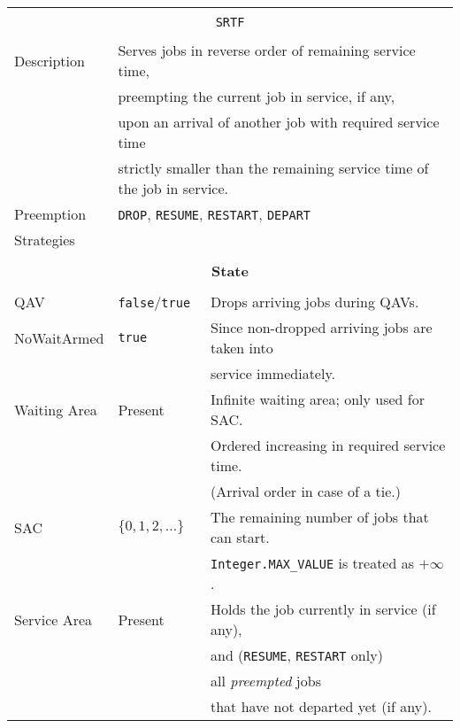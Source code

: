 \documentclass[12pt]{book}
\begin{document}
\begin{tabular}{|l|l|l|}
\hline
\multicolumn{3}{|c|}{} \\
\multicolumn{3}{|c|}{\lstinline[basicstyle=\large]{SRTF}} \\
\multicolumn{3}{|c|}{} \\
\hline
Description & \multicolumn{2}{l|}{Serves jobs in reverse order of remaining service time,} \\
            & \multicolumn{2}{l|}{preempting the current job in service, if any,} \\
            & \multicolumn{2}{l|}{upon an arrival of another job with required service time} \\
            & \multicolumn{2}{l|}{strictly smaller than the remaining service time of the job in service.} \\
\hline
Preemption  & \multicolumn{2}{l|}{\lstinline|DROP|, \lstinline|RESUME|, \lstinline|RESTART|, \lstinline|DEPART|} \\
Strategies  & \multicolumn{2}{l|}{ } \\
\hline
\multicolumn{3}{|c|}{} \\
\multicolumn{3}{|c|}{\bf State} \\
\multicolumn{3}{|c|}{} \\
\hline
QAV & \lstinline|false|/\lstinline|true| & Drops arriving jobs during QAVs. \\
\hline
NoWaitArmed & \lstinline|true| & Since non-dropped arriving jobs are taken into \\
            &                  & service immediately. \\
\hline
Waiting Area & Present & Infinite waiting area; only used for SAC. \\
             &         & Ordered increasing in required service time. \\
             &         & (Arrival order in case of a tie.) \\
\hline
SAC & $\{0, 1, 2, \ldots\}$ & The remaining number of jobs that can start. \\
    &                       & \lstinline|Integer.MAX_VALUE| is treated as $+\infty$. \\
\hline
Service Area & Present & Holds the job currently in service (if any), \\
             &         & and (\lstinline|RESUME|, \lstinline|RESTART| only) \\
             &         & all {\em preempted\/} jobs \\
             &         & that have not departed yet (if any). \\

\end{tabular}
\end{document}
